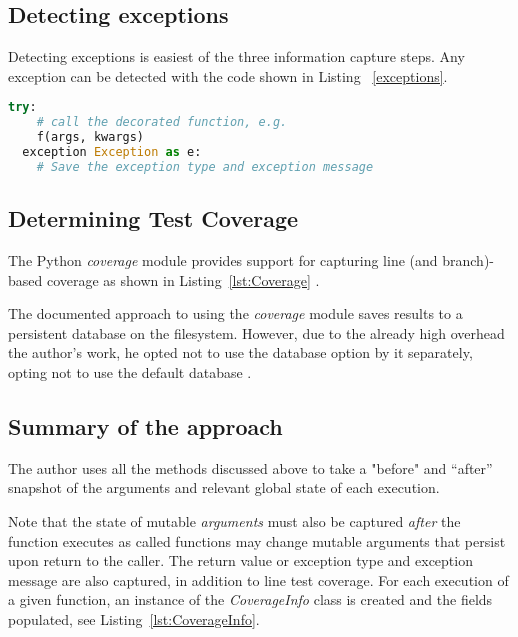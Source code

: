 \subsection{Detecting exceptions}\label{sec:approach-internal-3}
Detecting exceptions is easiest of the three information capture steps.
Any exception can be detected with the code shown in Listing 
~\ref{exceptions}.

\begin{lstlisting}[language=Python, caption={Catching and recording exceptions}, label={exceptions}]
  try:
    # call the decorated function, e.g.
    f(args, kwargs)
  exception Exception as e:
    # Save the exception type and exception message
  \end{lstlisting}

\subsection{Determining Test Coverage}\label{sec:approach-internal-4}
The Python \textit{coverage}
module provides support for capturing line (and branch)-based coverage
as shown in Listing~\ref{lst:Coverage} \cite{batchelder2024}.



The documented approach to using the \textit{coverage} module 
saves results to a persistent database on the filesystem.
However, due to the already high overhead the author's work, he opted not 
to use the database option by it separately, 
opting not to use the default database \cite{batchelder2024}.

\subsection{Summary of the approach}\label{sec:approach-internal-5}

The author uses all the methods discussed above to take a "before" and “after” 
snapshot of the arguments and relevant global state of each execution. 

Note that the state of mutable \textit{arguments} must also be captured 
\textit{after} the function executes as called functions may change mutable 
arguments that persist upon return to the caller. The return value or exception 
type and exception message are also captured, in addition to line test coverage. 
For each execution of a given function, an instance of the 
\textit{CoverageInfo} class is created and the fields populated, see 
Listing~\ref{lst:CoverageInfo}.

